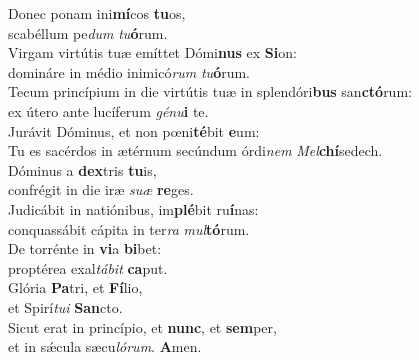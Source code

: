 \evenverse Donec ponam ini\textbf{mí}cos \textbf{tu}os,~\*\\
\evenverse scabéllum pe\textit{dum} \textit{tu}\textbf{ó}rum.\\
\oddverse Virgam virtútis tuæ emíttet Dómi\textbf{nus} ex \textbf{Si}on:~\*\\
\oddverse domináre in médio inimicó\textit{rum} \textit{tu}\textbf{ó}rum.\\
\evenverse Tecum princípium in die virtútis tuæ in splendóri\textbf{bus} san\textbf{ctó}rum:~\*\\
\evenverse ex útero ante lucíferum \textit{gé}\textit{nu}\textbf{i} te.\\
\oddverse Jurávit Dóminus, et non pœni\textbf{té}bit \textbf{e}um:~\*\\
\oddverse Tu es sacérdos in ætérnum secúndum órdi\textit{nem} \textit{Mel}\textbf{chí}sedech.\\
\evenverse Dóminus a \textbf{dex}tris \textbf{tu}is,~\*\\
\evenverse confrégit in die iræ \textit{su}\textit{æ} \textbf{re}ges.\\
\oddverse Judicábit in natiónibus, im\textbf{plé}bit ru\textbf{í}nas:~\*\\
\oddverse conquassábit cápita in ter\textit{ra} \textit{mul}\textbf{tó}rum.\\
\evenverse De torrénte in \textbf{vi}a \textbf{bi}bet:~\*\\
\evenverse proptérea exal\textit{tá}\textit{bit} \textbf{ca}put.\\
\oddverse Glória \textbf{Pa}tri, et \textbf{Fí}lio,~\*\\
\oddverse et Spirí\textit{tu}\textit{i} \textbf{San}cto.\\
\evenverse Sicut erat in princípio, et \textbf{nunc}, et \textbf{sem}per,~\*\\
\evenverse et in sǽcula sæcu\textit{ló}\textit{rum}. \textbf{A}men.\\

